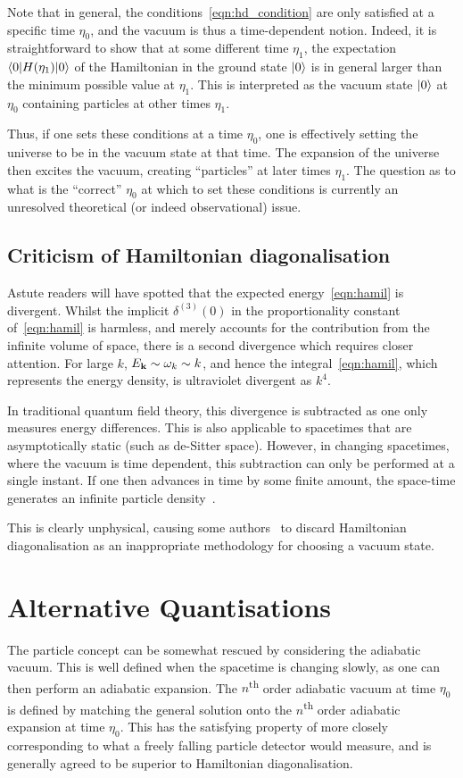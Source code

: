 Note that in general, the conditions~\eqref{eqn:hd_condition} are only satisfied at a specific time $\eta_0$, and the vacuum is thus a time-dependent notion. 
Indeed, it is straightforward to show that at some different time $\eta_1$, the expectation $\left\langle0\middle|H(\eta_1)\middle|0\right\rangle$ of the Hamiltonian in the ground state $\left|0\right\rangle$ is in general larger than the minimum possible value at $\eta_1$. This is interpreted as the vacuum state $\left|0\right\rangle$ at $\eta_0$ containing particles at other times $\eta_1$.

Thus, if one sets these conditions at a time $\eta_0$, one is effectively setting the universe to be in the vacuum state at that time. The expansion of the universe then excites the vacuum, creating ``particles'' at later times $\eta_1$. The question as to what is the ``correct'' $\eta_0$ at which to set these conditions is currently an unresolved theoretical (or indeed observational) issue. 


\subsection{Criticism of Hamiltonian diagonalisation}

Astute readers will have spotted that the expected energy~\eqref{eqn:hamil} is divergent. Whilst the implicit $\delta^{(3)}(0)$ in the proportionality constant of~\eqref{eqn:hamil} is harmless, and merely accounts for the contribution from the infinite volume of space, there is a second divergence which requires closer attention. For large $k$, $E_{\mathbf{k}}\sim \omega_k \sim k$, and hence the integral~\eqref{eqn:hamil}, which represents the energy density, is ultraviolet divergent as $k^4$. 

In traditional quantum field theory, this divergence is subtracted as one only measures energy differences. This is also applicable to spacetimes that are asymptotically static (such as de-Sitter space).
However, in changing spacetimes, where the vacuum is time dependent, this subtraction can only be performed at a single instant. If one then advances in time by some finite amount, the space-time generates an infinite particle density~\cite{Fulling_HD,Fulling+1989}. 

This is clearly unphysical, causing some authors~\cite{Fulling_HD} to discard Hamiltonian diagonalisation as an inappropriate methodology for choosing a vacuum state.

\section{Alternative Quantisations}
The particle concept can be somewhat rescued by considering the adiabatic vacuum. This is well defined when the spacetime is changing slowly, as one can then perform an adiabatic expansion. The $n$\textsuperscript{th} order adiabatic vacuum at time $\eta_0$ is defined by matching the general solution onto the $n$\textsuperscript{th} order adiabatic expansion at time $\eta_0$. This has the satisfying property of more closely corresponding to what a freely falling particle detector would measure, and is generally agreed to be superior to Hamiltonian diagonalisation.

